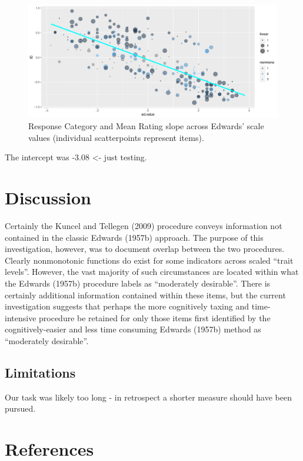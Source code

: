 \documentclass[
  ,man]{apa6}
\begin{document}
\begin{figure}
\centering
\includegraphics{KuncelTellegen_files/figure-latex/lastone-1.pdf}
\caption{\label{fig:lastone}Response Category and Mean Rating slope across Edwards' scale values (individual scatterpoints represent items).}
\end{figure}

The intercept was -3.08 \textless- just testing.

\hypertarget{discussion-1}{%
\section{Discussion}\label{discussion-1}}

Certainly the Kuncel and Tellegen (2009) procedure conveys information not contained in the classic Edwards (1957b) approach. The purpose of this investigation, however, was to document overlap between the two procedures. Clearly nonmonotonic functions do exist for some indicators across scaled ``trait levels''. However, the vast majority of such circumstances are located within what the Edwards (1957b) procedure labels as ``moderately desirable''. There is certainly additional information contained within these items, but the current investigation suggests that perhaps the more cognitively taxing and time-intensive procedure be retained for only those items first identified by the cognitively-easier and less time consuming Edwards (1957b) method as ``moderately desirable''.

\hypertarget{limitations}{%
\subsection{Limitations}\label{limitations}}

Our task was likely too long - in retrospect a shorter measure should have been pursued.

\hypertarget{references}{%
\section{References}\label{references}}
\end{document}
